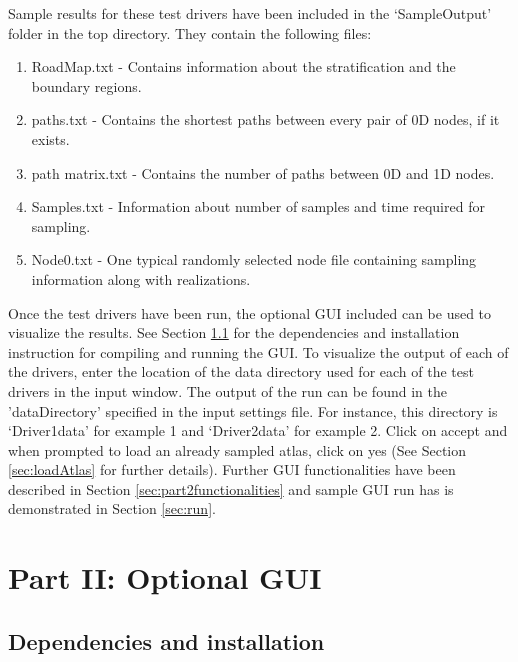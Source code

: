 \documentclass[10pt]{article}
\begin{document}
Sample results for these test drivers have been included in the `SampleOutput'
folder in the top directory. They contain the following files:
\begin{enumerate}
\item RoadMap.txt - Contains information about the stratification and the
boundary regions.

\item paths.txt - Contains the shortest paths between every pair of 0D nodes,
if it exists.

\item path matrix.txt - Contains the number of paths between 0D and 1D nodes.

\item Samples.txt - Information about number of samples and time required for
sampling.

\item Node0.txt - One typical randomly selected node file containing sampling
information along with realizations.

\end{enumerate}

Once the test drivers have been run, the optional GUI included can be used to
visualize the results. See Section \ref{sec:part2dependency} for the
dependencies and installation instruction for compiling and running the GUI. To
visualize the output of each of the drivers, enter the location of the data
directory used for each of the test drivers in the input window.  The output of
the run can be found in the 'dataDirectory' specified in the input settings
file. For instance, this directory is `Driver1data' for example 1 and
`Driver2data' for example 2.  Click on accept and when prompted to load an
already sampled atlas, click on yes (See Section \ref{sec:loadAtlas} for
further details). Further GUI functionalities have been described in Section
\ref{sec:part2functionalities} and sample GUI run has is demonstrated in
Section \ref{sec:run}.





\section{Part II: Optional GUI}
\label{part2}
\subsection{Dependencies and installation}
\label{sec:part2dependency}
\end{document}
